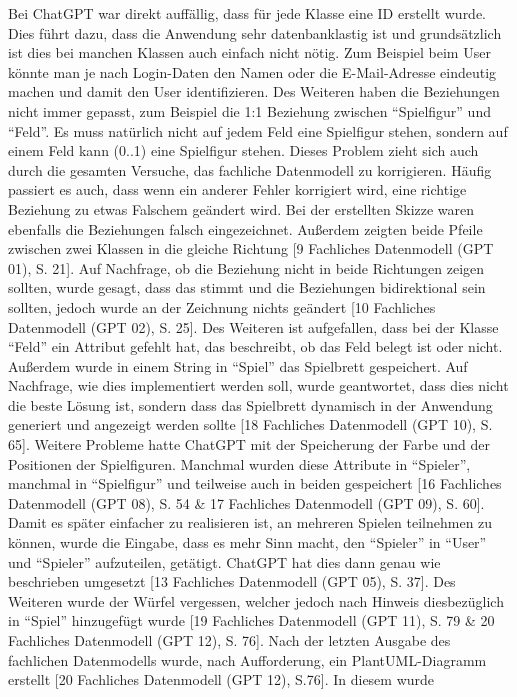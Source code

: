 Bei ChatGPT war direkt auffällig, dass für jede Klasse eine ID erstellt wurde. Dies führt dazu, dass die Anwendung sehr 
datenbanklastig ist und grundsätzlich ist dies bei manchen Klassen auch einfach nicht nötig. Zum Beispiel beim User könnte man 
je nach Login-Daten den Namen oder die E-Mail-Adresse eindeutig machen und damit den User identifizieren. Des Weiteren haben 
die Beziehungen nicht immer gepasst, zum Beispiel die 1:1 Beziehung zwischen ``Spielfigur'' und ``Feld''. Es muss natürlich nicht 
auf jedem Feld eine Spielfigur stehen, sondern auf einem Feld kann (0..1) eine Spielfigur stehen. Dieses Problem zieht sich auch 
durch die gesamten Versuche, das fachliche Datenmodell zu korrigieren. Häufig passiert es auch, dass wenn ein anderer Fehler korrigiert 
wird, eine richtige Beziehung zu etwas Falschem geändert wird. Bei der erstellten Skizze waren ebenfalls die Beziehungen falsch 
eingezeichnet. Außerdem zeigten beide Pfeile zwischen zwei Klassen in die gleiche Richtung [9 Fachliches Datenmodell (GPT 01), S. 21]. 
Auf Nachfrage, ob die Beziehung nicht in beide Richtungen zeigen sollten, wurde gesagt, dass das stimmt und die Beziehungen bidirektional 
sein sollten, jedoch wurde an der Zeichnung nichts geändert [10 Fachliches Datenmodell (GPT 02), S. 25]. Des Weiteren ist aufgefallen, 
dass bei der Klasse ``Feld'' ein Attribut gefehlt hat, das beschreibt, ob das Feld belegt ist oder nicht. Außerdem wurde in einem 
String in ``Spiel'' das Spielbrett gespeichert. Auf Nachfrage, wie dies implementiert werden soll, wurde geantwortet, dass dies nicht 
die beste Lösung ist, sondern dass das Spielbrett dynamisch in der Anwendung generiert und angezeigt werden sollte 
[18 Fachliches Datenmodell (GPT 10), S. 65]. Weitere Probleme hatte ChatGPT mit der Speicherung der Farbe und der Positionen der Spielfiguren. 
Manchmal wurden diese Attribute in ``Spieler'', manchmal in ``Spielfigur'' und teilweise auch in beiden gespeichert 
[16 Fachliches Datenmodell (GPT 08), S. 54 \& 17 Fachliches Datenmodell (GPT 09), S. 60]. Damit es später einfacher zu realisieren 
ist, an mehreren Spielen teilnehmen zu können, wurde die Eingabe, dass es mehr Sinn macht, den ``Spieler'' in ``User'' und ``Spieler'' 
aufzuteilen, getätigt. ChatGPT hat dies dann genau wie beschrieben umgesetzt [13 Fachliches Datenmodell (GPT 05), S. 37]. Des Weiteren 
wurde der Würfel vergessen, welcher jedoch nach Hinweis diesbezüglich in ``Spiel'' hinzugefügt wurde 
[19 Fachliches Datenmodell (GPT 11), S. 79 \& 20 Fachliches Datenmodell (GPT 12), S. 76]. Nach der letzten Ausgabe des fachlichen 
Datenmodells wurde, nach Aufforderung, ein PlantUML-Diagramm erstellt [20 Fachliches Datenmodell (GPT 12), S.76]. In diesem wurde 
